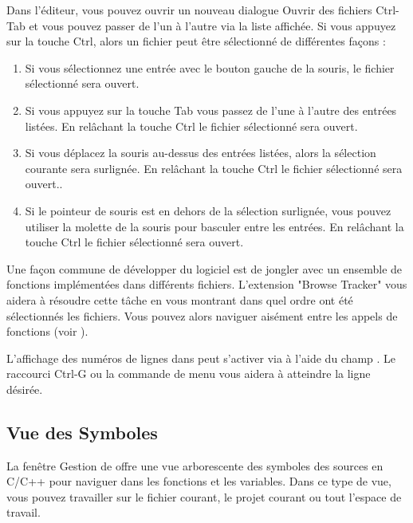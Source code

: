 Dans l'éditeur, vous pouvez ouvrir un nouveau dialogue Ouvrir des fichiers Ctrl-Tab et vous pouvez passer de l'un à l'autre via la liste affichée. Si vous appuyez sur la touche Ctrl, alors un fichier peut être sélectionné de différentes façons :

\begin{enumerate}
\item Si vous sélectionnez une entrée avec le bouton gauche de la souris, le fichier sélectionné sera ouvert.
\item Si vous appuyez sur la touche Tab vous passez de l'une à l'autre des entrées listées. En relâchant la touche Ctrl le fichier sélectionné sera ouvert.
\item Si vous déplacez la souris au-dessus des entrées listées, alors la sélection courante sera surlignée. En relâchant la touche Ctrl le fichier sélectionné sera ouvert..
\item Si le pointeur de souris est en dehors de la sélection surlignée, vous pouvez utiliser la molette de la souris pour basculer entre les entrées. En relâchant la touche Ctrl le fichier sélectionné sera ouvert.
\end{enumerate}

Une façon commune de développer du logiciel est de jongler avec un ensemble de fonctions implémentées dans différents fichiers. L'extension "Browse Tracker" vous aidera à résoudre cette tâche en vous montrant dans quel ordre ont été sélectionnés les fichiers. Vous pouvez alors naviguer aisément entre les appels de fonctions (voir ).

L'affichage des numéros de lignes dans \codeblocks peut s'activer via  à l'aide du champ . Le raccourci Ctrl-G ou la commande de menu  vous aidera à atteindre la ligne désirée.


\subsection{Vue des Symboles}

La fenêtre Gestion de \codeblocks offre une vue arborescente des symboles des sources en C/C++ pour naviguer dans les fonctions et les variables. Dans ce type de vue, vous pouvez travailler sur le fichier courant, le projet courant ou tout l'espace de travail.

